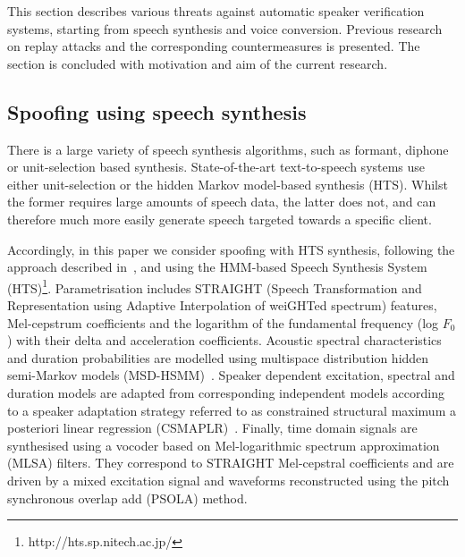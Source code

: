 This section describes various threats against automatic speaker verification systems, starting from speech synthesis and voice conversion. Previous research on replay attacks and the corresponding countermeasures is presented. The section is concluded with motivation and aim of the current research.

\subsection{Spoofing using speech synthesis}

There is a large variety of speech synthesis algorithms, such as formant, diphone or unit-selection based synthesis. State-of-the-art text-to-speech systems use either unit-selection or the hidden Markov model-based synthesis (HTS). Whilst the former requires large amounts of speech data, the latter does not, and can therefore much more easily generate speech targeted towards a specific client. 

Accordingly, in this paper we consider spoofing with HTS synthesis, following the approach described in~\cite{Yamagishi2009}, and using the HMM-based Speech Synthesis System (HTS)\footnote{http://hts.sp.nitech.ac.jp/}. Parametrisation includes STRAIGHT (Speech Transformation and Representation using Adaptive Interpolation of weiGHTed spectrum) features, Mel-cepstrum coefficients and the logarithm of the fundamental frequency (log $F_{0}$) with their delta and acceleration coefficients. Acoustic spectral characteristics and duration probabilities are modelled using multispace distribution hidden semi-Markov models (MSD-HSMM)~\cite{Russell1985}.  Speaker dependent  excitation, spectral and duration models are adapted from corresponding independent models according to a speaker adaptation strategy referred to as constrained structural maximum a posteriori linear regression (CSMAPLR)~\cite{Yamagishi2009a}.  Finally, time domain signals are synthesised using a vocoder based on Mel-logarithmic spectrum approximation (MLSA) filters.  They correspond to STRAIGHT Mel-cepstral coefficients and are driven by a mixed excitation signal and waveforms reconstructed using the pitch synchronous overlap add (PSOLA) method.



